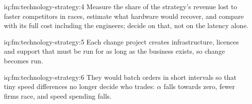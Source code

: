 \begin{solution}{iq:fm:technology-strategy:4}
Measure the share of the strategy's revenue lost to faster competitors in races, estimate what hardware would recover, and compare with its full
cost including the engineers; decide on that, not on the latency alone.
\end{solution}

\begin{solution}{iq:fm:technology-strategy:5}
Each change project creates infrastructure, licences and support that must be run for as long as the business exists, so change becomes run.
\end{solution}

\begin{solution}{iq:fm:technology-strategy:6}
They would batch orders in short intervals so that tiny speed differences no longer decide who trades: $\alpha$ falls towards zero, fewer firms
race, and speed spending falls.
\end{solution}

